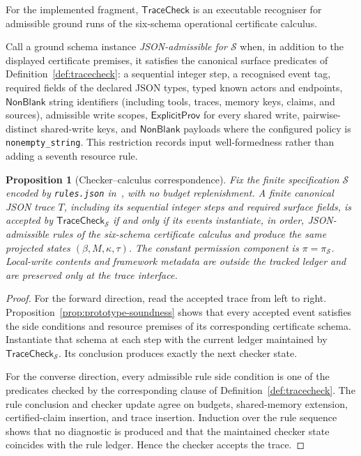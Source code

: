 \documentclass[a4paper,fleqn]{cas-sc}
\newtheorem{proposition}{Proposition}
\newcommand{\TraceCheck}{\mathsf{TraceCheck}}
\begin{document}
For the implemented fragment, \(\TraceCheck\) is an executable recogniser for
admissible ground runs of the six-schema operational certificate calculus.

Call a ground schema instance \emph{JSON-admissible for \(\mathcal S\)} when,
in addition to the displayed certificate premises, it satisfies the canonical
surface predicates of Definition~\ref{def:tracecheck}: a sequential integer
step, a recognised event tag, required fields of the declared JSON types,
typed known actors and endpoints, \(\mathsf{NonBlank}\) string identifiers
(including tools, traces, memory keys, claims, and sources), admissible write
scopes, \(\mathsf{ExplicitProv}\) for every shared write, pairwise-distinct
shared-write keys, and \(\mathsf{NonBlank}\) payloads where the configured
policy is \texttt{nonempty\_string}. This restriction records input
well-formedness rather than adding a seventh resource rule.

\begin{proposition}[Checker--calculus correspondence]\label{prop:checker-adequacy}
Fix the finite specification \(\mathcal{S}\) encoded by \texttt{rules.json}
in~\cite{artifact2026}, with no budget replenishment. A finite canonical JSON
trace \(T\), including its sequential integer steps and required surface
fields, is accepted by \(\TraceCheck_{\mathcal{S}}\) if and only if its events
instantiate, in order, JSON-admissible rules of the six-schema certificate
calculus and produce the same projected states \((\beta,M,\kappa,\tau)\). The
constant permission component is \(\pi=\pi_{\mathcal S}\). Local-write contents
and framework metadata are outside the tracked ledger and are preserved only at
the trace interface.
\end{proposition}

\begin{proof}
For the forward direction, read the accepted trace from left to right. Proposition~\ref{prop:prototype-soundness} shows that every accepted event satisfies the side conditions and resource premises of its corresponding certificate schema. Instantiate that schema at each step with the current ledger maintained by \(\TraceCheck_{\mathcal{S}}\). Its conclusion produces exactly the next checker state.

For the converse direction, every admissible rule side condition is one of the predicates checked by the corresponding clause of Definition~\ref{def:tracecheck}. The rule conclusion and checker update agree on budgets, shared-memory extension, certified-claim insertion, and trace insertion. Induction over the rule sequence shows that no diagnostic is produced and that the maintained checker state coincides with the rule ledger. Hence the checker accepts the trace.
\end{proof}
\end{document}
